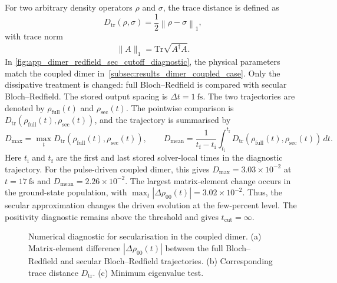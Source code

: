 For two arbitrary density operators \(\rho\) and \(\sigma\), the trace distance is defined as
\begin{equation*}
D_{\mathrm{tr}}(\rho,\sigma)
=
\frac{1}{2}\left\|\rho-\sigma\right\|_1,
\end{equation*}
with trace norm
\begin{equation*}
\|A\|_1 = \mathrm{Tr}\sqrt{A^{\dagger}A}.
\end{equation*}
In \autoref{fig:app_dimer_redfield_sec_cutoff_diagnostic}, the physical parameters match the coupled dimer in~\autoref{subsec:results_dimer_coupled_case}. Only the dissipative treatment is changed: full Bloch--Redfield is compared with secular Bloch--Redfield. The stored output spacing is \(\Delta t=\SI{1}{\femto\second}\). The two trajectories are denoted by \(\rho_{\mathrm{full}}(t)\) and \(\rho_{\mathrm{sec}}(t)\). The pointwise comparison is \(D_{\mathrm{tr}}(\rho_{\mathrm{full}}(t),\rho_{\mathrm{sec}}(t))\), and the trajectory is summarised by
\begin{equation*}
D_{\max} = \max_t D_{\mathrm{tr}}(\rho_{\mathrm{full}}(t),\rho_{\mathrm{sec}}(t)),
\qquad
D_{\mathrm{mean}} =
\frac{1}{t_{\mathrm{f}}-t_{\mathrm{i}}}\int_{t_{\mathrm{i}}}^{t_{\mathrm{f}}}
D_{\mathrm{tr}}(\rho_{\mathrm{full}}(t),\rho_{\mathrm{sec}}(t))\,dt.
\end{equation*}
Here \(t_{\mathrm{i}}\) and \(t_{\mathrm{f}}\) are the first and last stored
solver-local times in the diagnostic trajectory.
For the pulse-driven coupled dimer, this gives \(D_{\max}=3.03\times10^{-2}\) at \(t=\SI{17}{\femto\second}\) and \(D_{\mathrm{mean}}=2.26\times10^{-2}\). The largest matrix-element change occurs in the ground-state population, with \(\max_t |\Delta\rho_{00}(t)| = 3.02\times10^{-2}\). Thus, the secular approximation changes the driven evolution at the few-percent level. The positivity diagnostic remains above the threshold and gives \(t_{\mathrm{cut}}=\infty\).

\begin{figure}[htbp]
    \centering
    \caption{Numerical diagnostic for secularisation in the coupled dimer. (a) Matrix-element difference \(|\Delta\rho_{00}(t)|\) between the full Bloch--Redfield and secular Bloch--Redfield trajectories. (b) Corresponding trace distance \(D_{\mathrm{tr}}\). (c) Minimum eigenvalue test.}
    \label{fig:app_dimer_redfield_sec_cutoff_diagnostic}
\end{figure}

